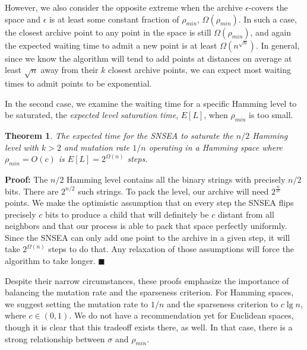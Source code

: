 \documentclass[twoside]{article}
\newtheorem{theorem}{Theorem}
\begin{document}
\vspace*{1ex}

However, we also consider the opposite extreme when the archive $\epsilon$-covers the space and $\epsilon$ is at least some constant fraction of $\rho_{min}$, $\Omega(\rho_{min})$.  In such a case, the closest archive point to any point in the space is still $\Omega(\rho_{min})$, and again the expected waiting time to admit a new point is at least $\Omega(n^{\sqrt{n}})$.  In general, since we know the algorithm will tend to add points at distances on average at least $\sqrt{n}$ away from their $k$ closest archive points, we can expect most waiting times to admit points to be exponential.



In the second case, we examine the waiting time for a specific Hamming level to be saturated, the \emph{expected level saturation time}, $E[L]$, when $\rho_{min}$ is too small.

\begin{theorem}
The expected time for the SNSEA to saturate the $n/2$ Hamming level with $k>2$ and mutation rate $1/n$ operating in a Hamming space where $\rho_{min} = O(c)$ is $E[L] = 2^{\Omega(n)}$ steps.
\end{theorem}
\textbf{Proof:} The $n/2$ Hamming level contains all the binary strings with precisely $n/2$ bits.  There are $2^{n/2}$ such strings.  To pack the level, our archive will need $2^\frac{n}{2c}$ points.  We make the optimistic assumption that on every step the SNSEA flips precisely $c$ bits to produce a child that will definitely be $c$ distant from all neighbors and that our process is able to pack that space perfectly uniformly.  Since the SNSEA can only add one point to the archive in a given step, it will take $2^{\Omega(n)}$ steps to do that. Any relaxation of those assumptions will force the algorithm to take longer. $\blacksquare$

\vspace*{1ex}

Despite their narrow circumstances, these proofs emphasize the importance of balancing the mutation rate and the sparseness criterion.  For Hamming spaces, we suggest setting the mutation rate to $1/n$ and the sparseness criterion to $c\lg n$, where $c\in (0,1)$.  We do not have a recommendation yet for Euclidean spaces, though it is clear that this tradeoff exists there, as well.  In that case, there is a strong relationship between $\sigma$ and $\rho_{min}$.
\end{document}
